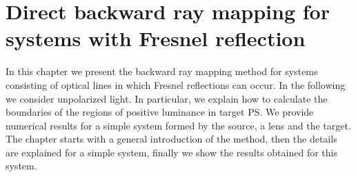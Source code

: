 \chapter{Direct backward ray mapping for systems with Fresnel reflection}
\label{chap:fresnel}
In this chapter we present the backward ray mapping method for systems consisting of optical lines in which Fresnel reflections can occur. In the following we consider unpolarized light. In particular, we explain how to calculate the boundaries of the regions of positive luminance in target PS. We provide numerical results for a simple system formed by the source, a lens and the target. 
The chapter starts with a general introduction of the method, then the details are explained for a simple system, finally we show the results obtained for this system.
